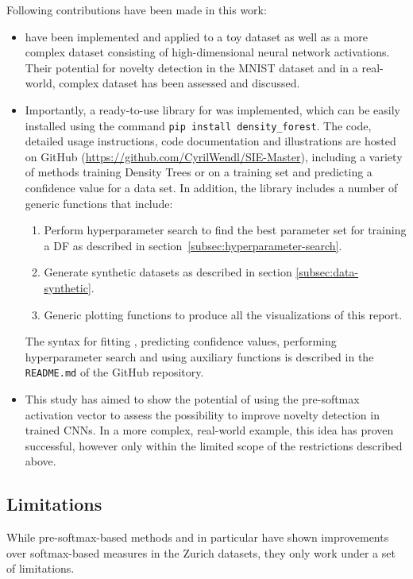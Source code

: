 \documentclass[10pt]{article}
\begin{document}
Following contributions have been made in this work:
\begin{itemize}
	\item {} have been implemented and applied to a toy dataset as well as a more complex dataset consisting of high-dimensional neural network activations. Their potential for novelty detection in the \gls{MNIST} dataset and in a real-world, complex dataset has been assessed and discussed.
	\item Importantly, a ready-to-use library for  was implemented, which can be easily installed using the command \texttt{pip install density\_forest}. The code, detailed usage instructions, code documentation and illustrations are hosted on GitHub (\url{https://github.com/CyrilWendl/SIE-Master}), including a variety of methods training Density Trees or  on a training set and predicting a confidence value for a data set. In addition, the library includes a number of generic functions that include:
	\begin{enumerate}
		\item Perform hyperparameter search to find the best parameter set for training a \acrlong{DF} as described in section \ref{subsec:hyperparameter-search}.
		\item Generate synthetic datasets as described in section \ref{subsec:data-synthetic}.
		\item Generic plotting functions to produce all the visualizations of this report.
	\end{enumerate}
	The syntax for fitting , predicting confidence values, performing hyperparameter search and using auxiliary functions is described in the \texttt{README.md} of the GitHub repository.
	\item This study has aimed to show the potential of using the pre-softmax activation vector to assess the possibility to improve novelty detection in trained \glspl{CNN}. In a more complex, real-world example, this idea has proven successful, however only within the limited scope of the restrictions described above.
\end{itemize}

\subsection{Limitations}
While pre-softmax-based methods and  in particular have shown improvements over softmax-based measures in the Zurich datasets, they only work under a set of limitations.
\end{document}
